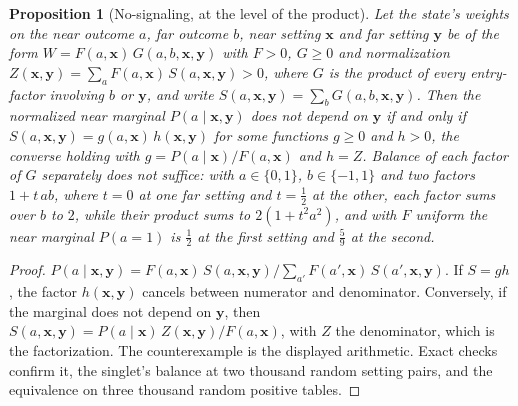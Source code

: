 \documentclass[11pt]{article}
\newtheorem{proposition}{Proposition}
\begin{document}
\begin{proposition}[No-signaling, at the level of the product]\label{prop:nosignal}
Let the state's weights on the near outcome $a$, far outcome $b$, near setting $\mathbf{x}$ and far setting $\mathbf{y}$ be of the form $W = F(a, \mathbf{x})\, G(a, b, \mathbf{x}, \mathbf{y})$ with $F > 0$, $G \ge 0$ and normalization $Z(\mathbf{x}, \mathbf{y}) = \sum_a F(a, \mathbf{x})\, S(a, \mathbf{x}, \mathbf{y}) > 0$, where $G$ is the product of every entry-factor involving $b$ or $\mathbf{y}$, and write $S(a, \mathbf{x}, \mathbf{y}) = \sum_b G(a, b, \mathbf{x}, \mathbf{y})$. Then the normalized near marginal $P(a \mid \mathbf{x}, \mathbf{y})$ does not depend on $\mathbf{y}$ if and only if $S(a, \mathbf{x}, \mathbf{y}) = g(a, \mathbf{x})\, h(\mathbf{x}, \mathbf{y})$ for some functions $g \ge 0$ and $h > 0$, the converse holding with $g = P(a \mid \mathbf{x}) / F(a, \mathbf{x})$ and $h = Z$. Balance of each factor of $G$ separately does not suffice: with $a \in \{0, 1\}$, $b \in \{-1, 1\}$ and two factors $1 + t\, ab$, where $t = 0$ at one far setting and $t = \tfrac12$ at the other, each factor sums over $b$ to $2$, while their product sums to $2(1 + t^2 a^2)$, and with $F$ uniform the near marginal $P(a = 1)$ is $\tfrac12$ at the first setting and $\tfrac59$ at the second.
\end{proposition}
\begin{proof}
$P(a \mid \mathbf{x}, \mathbf{y}) = F(a, \mathbf{x})\, S(a, \mathbf{x}, \mathbf{y}) \big/ \sum_{a'} F(a', \mathbf{x})\, S(a', \mathbf{x}, \mathbf{y})$. If $S = g h$, the factor $h(\mathbf{x}, \mathbf{y})$ cancels between numerator and denominator. Conversely, if the marginal does not depend on $\mathbf{y}$, then $S(a, \mathbf{x}, \mathbf{y}) = P(a \mid \mathbf{x})\, Z(\mathbf{x}, \mathbf{y}) / F(a, \mathbf{x})$, with $Z$ the denominator, which is the factorization. The counterexample is the displayed arithmetic. Exact checks confirm it, the singlet's balance at two thousand random setting pairs, and the equivalence on three thousand random positive tables.
\end{proof}
\end{document}
